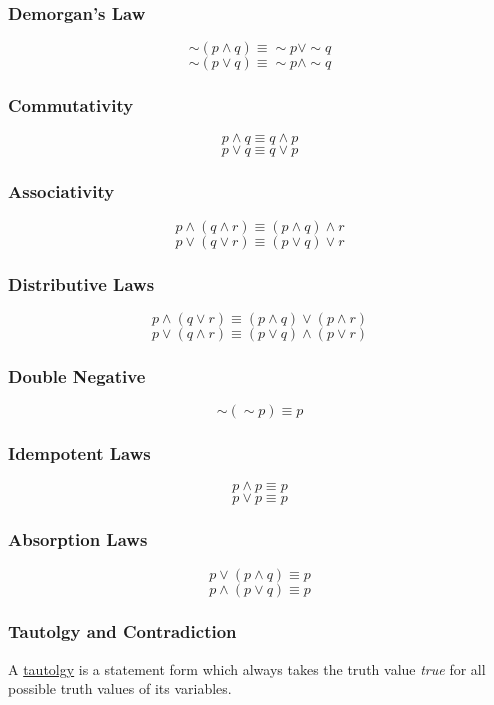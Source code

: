 \begin{multicols}{2}
\subsubsection{Demorgan's Law}
$$\sim\left(p\land q\right) \equiv \sim p \lor \sim q$$
$$\sim\left(p\lor q\right) \equiv \sim p \land \sim q$$

\subsubsection{Commutativity}
$$p\land q \equiv q \land p$$
$$p\lor q \equiv q \lor p$$

\subsubsection{Associativity}
$$p\land \left(q\land r\right) \equiv \left(p\land q\right)\land r$$
$$p\lor \left(q\lor r\right) \equiv \left(p\lor q\right)\lor r$$

\subsubsection{Distributive Laws}
$$p\land \left(q\lor r\right) \equiv \left(p\land q\right) \lor \left(p\land r\right)$$
$$p\lor \left(q\land r\right) \equiv \left(p\lor q\right) \land \left(p\lor r\right)$$

\subsubsection{Double Negative}
$$\sim\left(\sim p\right) \equiv p$$

\subsubsection{Idempotent Laws}
$$p\land p \equiv p$$
$$p\lor p\equiv p$$

\subsubsection{Absorption Laws}
$$p\lor \left(p\land q\right)\equiv p$$
$$p\land \left(p\lor q\right)\equiv p$$
\end{multicols}


\subsubsection{Tautolgy and Contradiction}
\begin{definition}
    A \underline{tautolgy} is a statement form which always takes the truth value \emph{true} for all possible truth values of its variables.
\end{definition}

